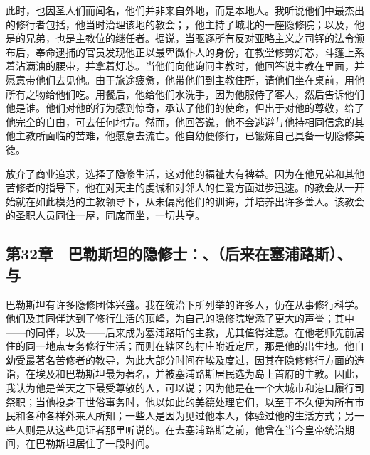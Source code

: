 此时，\newline{}也因圣人们而闻名，他们并非来自外地，而是本地人。\newline{}我听说他们中最杰出的修行者包括，他当时治理该地的教会；，他主持了城北的一座隐修院；以及，他是的兄弟，也是主教位的继任者。据说，当驱逐所有反对亚略主义之司铎的法令颁布后，奉命逮捕的官员发现他正以最卑微仆人的身份，在教堂修剪灯芯，斗篷上系着沾满油的腰带，并拿着灯芯。当他们向他询问主教时，他回答说主教在里面，并愿意带他们去见他。由于旅途疲惫，他带他们到主教住所，请他们坐在桌前，用他所有之物给他们吃。用餐后，他给他们水洗手，因为他服侍了客人，然后告诉他们他是谁。他们对他的行为感到惊奇，承认了他们的使命，但出于对他的尊敬，给了他完全的自由，可去任何地方。然而，他回答说，他不会逃避与他持相同信念的其他主教所面临的苦难，他愿意去流亡。他自幼便修行，已锻炼自己具备一切隐修美德。\par

放弃了商业追求，选择了隐修生活，这对他的福祉大有裨益。因为在他兄弟和其他苦修者的指导下，他在对天主的虔诚和对邻人的仁爱方面进步迅速。的教会从一开始就在如此模范的主教领导下，从未偏离他们的训诲，并培养出许多善人。该教会的圣职人员同住一屋，同席而坐，一切共享。\par


\subsection{第32章　巴勒斯坦的隐修士：、（后来在塞浦路斯）、与}

巴勒斯坦有许多隐修团体兴盛。我在统治下所列举的许多人，仍在从事修行科学。他们及其同伴达到了修行生活的顶峰，为自己的隐修院增添了更大的声誉；其中——的同伴，以及——后来成为塞浦路斯的主教，尤其值得注意。在他老师先前居住的同一地点专务修行生活；而则在辖区的村庄附近定居，那是他的出生地。他自幼受最著名苦修者的教导，为此大部分时间在埃及度过，因其在隐修修行方面的造诣，在埃及和巴勒斯坦最为著名，并被塞浦路斯居民选为岛上首府的主教。因此，我认为他是普天之下最受尊敬的人，可以说；因为他是在一个大城市和港口履行司祭职；当他投身于世俗事务时，他以如此的美德处理它们，以至于不久便为所有市民和各种各样外来人所知；一些人是因为见过他本人，体验过他的生活方式；另一些人则是从这些见证者那里听说的。在去塞浦路斯之前，他曾在当今皇帝统治期间，在巴勒斯坦居住了一段时间。\par

